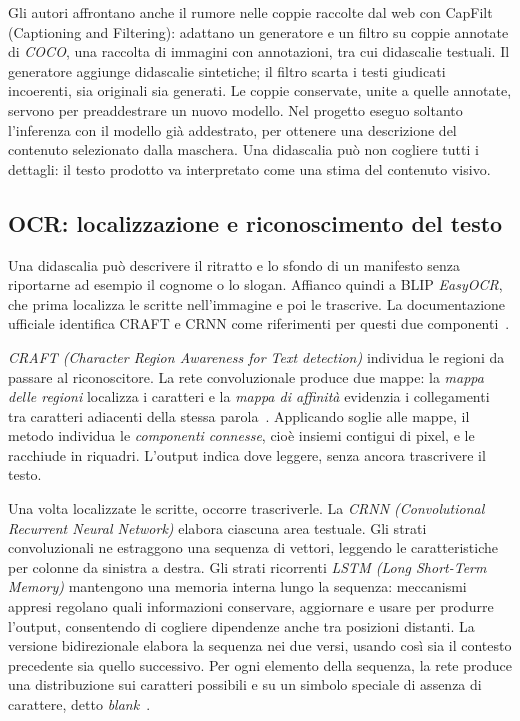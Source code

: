 Gli autori affrontano anche il rumore nelle coppie raccolte dal web con CapFilt (Captioning and Filtering): adattano un generatore e un filtro su coppie annotate di \emph{COCO}, una raccolta di immagini con annotazioni, tra cui didascalie testuali. Il generatore aggiunge didascalie sintetiche; il filtro scarta i testi giudicati incoerenti, sia originali sia generati. Le coppie conservate, unite a quelle annotate, servono per preaddestrare un nuovo modello. Nel progetto eseguo soltanto l'inferenza con il modello già addestrato, per ottenere una descrizione del contenuto selezionato dalla maschera. Una didascalia può non cogliere tutti i dettagli: il testo prodotto va interpretato come una stima del contenuto visivo.

\subsection{OCR: localizzazione e riconoscimento del testo}
\label{subsec:background-ocr}

Una didascalia può descrivere il ritratto e lo sfondo di un manifesto senza riportarne ad esempio il cognome o lo slogan. Affianco quindi a BLIP \emph{EasyOCR}, che prima localizza le scritte nell'immagine e poi le trascrive. La documentazione ufficiale identifica CRAFT e CRNN come riferimenti per questi due componenti~\cite{easyocr_software}.

\emph{CRAFT (Character Region Awareness for Text detection)} individua le regioni da passare al riconoscitore. La rete convoluzionale produce due mappe: la \emph{mappa delle regioni} localizza i caratteri e la \emph{mappa di affinità} evidenzia i collegamenti tra caratteri adiacenti della stessa parola~\cite{DBLP:journals/corr/abs-1904-01941}. Applicando soglie alle mappe, il metodo individua le \emph{componenti connesse}, cioè insiemi contigui di pixel, e le racchiude in riquadri. L'output indica dove leggere, senza ancora trascrivere il testo.

Una volta localizzate le scritte, occorre trascriverle. La \emph{CRNN (Convolutional Recurrent Neural Network)} elabora ciascuna area testuale. Gli strati convoluzionali ne estraggono una sequenza di vettori, leggendo le caratteristiche per colonne da sinistra a destra. Gli strati ricorrenti \emph{LSTM (Long Short-Term Memory)} mantengono una memoria interna lungo la sequenza: meccanismi appresi regolano quali informazioni conservare, aggiornare e usare per produrre l'output, consentendo di cogliere dipendenze anche tra posizioni distanti. La versione bidirezionale elabora la sequenza nei due versi, usando così sia il contesto precedente sia quello successivo. Per ogni elemento della sequenza, la rete produce una distribuzione sui caratteri possibili e su un simbolo speciale di assenza di carattere, detto \emph{blank}~\cite{DBLP:journals/corr/ShiBY15}.

